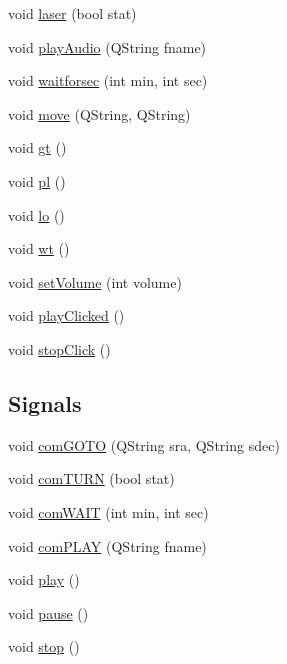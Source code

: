 \begin{DoxyCompactItemize}
\item 
void \hyperlink{class_o_s_p_main_dialog_a0dc634b74f2f1e2a0fcf3e948e46b761}{laser} (bool stat)
\item 
void \hyperlink{class_o_s_p_main_dialog_ad3fec79d0def25964f5adab237abf682}{play\-Audio} (Q\-String fname)
\item 
void \hyperlink{class_o_s_p_main_dialog_ad59f47b89d0a2d70d6ec56829069641d}{waitforsec} (int min, int sec)
\item 
void \hyperlink{class_o_s_p_main_dialog_a926b0132bfacc026a35847ec0c1f8b0a}{move} (Q\-String, Q\-String)
\item 
void \hyperlink{class_o_s_p_main_dialog_aab37bcc54ff79d3bf3a1442b3fa27072}{gt} ()
\item 
void \hyperlink{class_o_s_p_main_dialog_a30be772a3ccc49a2e06ce3417f2f2d5c}{pl} ()
\item 
void \hyperlink{class_o_s_p_main_dialog_accc6706706a6606f941b913cd9e6bdb6}{lo} ()
\item 
void \hyperlink{class_o_s_p_main_dialog_a8f6b102204eb71c786ddc3d05e80601e}{wt} ()
\item 
void \hyperlink{class_o_s_p_main_dialog_ab8473d80b4c5220361b55d310c033858}{set\-Volume} (int volume)
\item 
void \hyperlink{class_o_s_p_main_dialog_a2427cbbbec577cd4df51f5a993a74bf8}{play\-Clicked} ()
\item 
void \hyperlink{class_o_s_p_main_dialog_a5781ec6f0fa33cea8174fcaf335664af}{stop\-Click} ()
\end{DoxyCompactItemize}
\subsection*{Signals}
\begin{DoxyCompactItemize}
\item 
void \hyperlink{class_o_s_p_main_dialog_a35e47dd2960e4a5b1ca07ce11a806432}{com\-G\-O\-T\-O} (Q\-String sra, Q\-String sdec)
\item 
void \hyperlink{class_o_s_p_main_dialog_a5b5dea4eef55d376856d4cfd7eba92f3}{com\-T\-U\-R\-N} (bool stat)
\item 
void \hyperlink{class_o_s_p_main_dialog_a761b06593a36f1830a009ca4f644c859}{com\-W\-A\-I\-T} (int min, int sec)
\item 
void \hyperlink{class_o_s_p_main_dialog_a022dc536831ad2fa62b3935ff64d977e}{com\-P\-L\-A\-Y} (Q\-String fname)
\item 
void \hyperlink{class_o_s_p_main_dialog_a42763b78bcbcb452a8c8054de364f6fc}{play} ()
\item 
void \hyperlink{class_o_s_p_main_dialog_aa1e618f2fe9cb6253b9a783faf34f6c7}{pause} ()
\item 
void \hyperlink{class_o_s_p_main_dialog_a53f55236a4ab1d0569fc8b2be4a3753e}{stop} ()
\end{DoxyCompactItemize}

